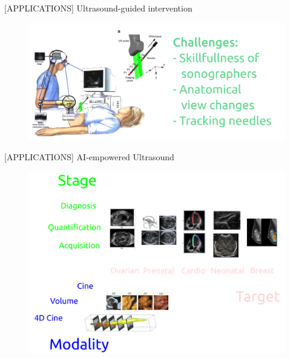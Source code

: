 {
    \begin{frame}{[\faUserMd APPLICATIONS] Ultrasound-guided intervention}
      \begin{figure}
        \centering
        \includegraphics[width=1.0\textwidth]{./../figures/sonographer-probe-patient/versions/drawing-v03.png}
      \end{figure}
\end{frame}
}


{
    \begin{frame}{[\faUserMd APPLICATIONS] AI-empowered Ultrasound}
      \begin{figure}
        \centering
        \includegraphics[width=1.0\textwidth]{./../figures/ai-empowered-us/versions/drawing-v00.png}
      \end{figure}
\end{frame}
}

